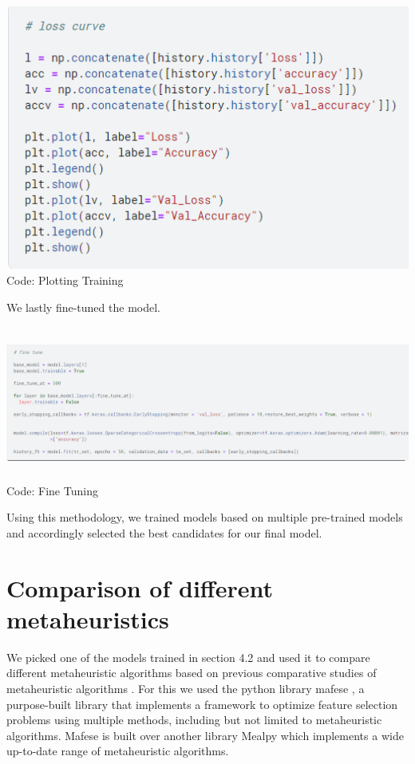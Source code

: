 \begin{center}
   \includegraphics[width=5.5in]{images/c5.png} 
   \\\fontsize{11pt}{24pt} Code: Plotting Training
\end{center}
  
We lastly fine-tuned the model.
\begin{center}
   \includegraphics[width=6.5in,height=2in]{images/c6.png} 
   \\\fontsize{11pt}{24pt} Code: Fine Tuning
\end{center}

  
Using this methodology, we trained models based on multiple pre-trained models and accordingly selected the best candidates for our final model. 

\section{Comparison of different metaheuristics}

We picked one of the models trained in section 4.2 and used it to compare different metaheuristic algorithms based on previous comparative studies of metaheuristic algorithms  \cite{13}. For this we used the python library mafese  \cite{28mafese}, a purpose-built library that implements a framework to optimize feature selection problems using multiple methods, including but not limited to metaheuristic algorithms. Mafese is built over another library Mealpy which implements a wide up-to-date range of metaheuristic algorithms. 


